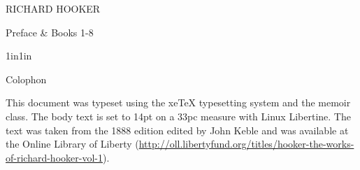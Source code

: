 \documentclass[a4paper,14pt,extrafontsizes]{memoir}
\begin{document}
\frontmatter


\pagestyle{empty}
\begin{center}
  \LARGE{RICHARD HOOKER} \par \vspace{1.2in} 
   \par \vspace{0.2in}
   \par \vspace{0.2in}
   \par \vspace{1.5in}
  \LARGE{Preface \& Books 1-8}
\end{center}

\cleardoublepage
{}
\pagestyle{headings}
\tableofcontents*   %


\mainmatter
{}
\pagestyle{ocd}






%





\backmatter
\cleardoublepage
\pagestyle{empty}
\null\vfil

\begin{adjustwidth}{1in}{1in}
\begin{center}
{\Large\textsf{Colophon}}
\end{center}
\begin{center}
  This document was typeset using the xeTeX typesetting system
  and the memoir class. The body text is set to 14pt on a
  33pc measure with Linux Libertine. The text was taken from the
  1888 edition edited by John Keble and was available at the 
  Online Library of Liberty
  (\url{http://oll.libertyfund.org/titles/hooker-the-works-of-richard-hooker-vol-1}).
\end{center}
\end{adjustwidth}
 {}  %

\vfil
\end{document}
